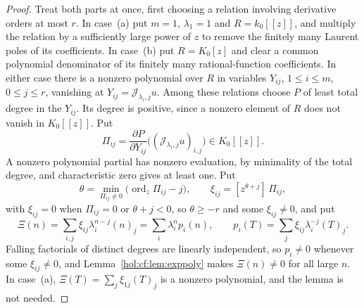 \documentclass[11pt]{article}
\numberwithin{equation}{section}
\theoremstyle{definition}
\theoremstyle{remark}
\newcommand{\fall}[2]{(#1)_{\underline{#2}}}
\newcommand{\ordz}{\operatorname{ord}_z}
\newcommand{\coeffz}[2]{[z^{#1}]\,#2}
\newcommand{\jet}[2]{\mathcal J_{#1,#2}}
\begin{document}
\begin{proof}
Treat both parts at once, first choosing a relation involving derivative
orders at most $r$. In case~(a) put $m=1$, $\lambda_1=1$ and
$R=k_0[[z]]$, and multiply the relation by a sufficiently large power of $z$
to remove the finitely many Laurent poles of its coefficients. In case~(b)
put $R=K_0[z]$ and clear a common polynomial denominator of its finitely many
rational-function coefficients. In either case there is a nonzero
polynomial over $R$ in variables $Y_{ij}$, $1\le i\le m$, $0\le j\le r$,
vanishing at $Y_{ij}=\jet{\lambda_i}ju$. Among these relations choose $P$ of
least total degree in the $Y_{ij}$. Its degree is positive, since a nonzero
element of $R$ does not vanish in $K_0[[z]]$. Put
\[
 \Pi_{ij}=\frac{\partial P}{\partial Y_{ij}}
 \bigl((\jet{\lambda_i}ju)_{i,j}\bigr)\in K_0[[z]].
\]
A nonzero polynomial partial has nonzero evaluation, by minimality of the
total degree, and characteristic zero gives at least one. Put
\begin{equation}\label{hol:cf:eq:theta}
 \theta=\min_{\Pi_{ij}\ne0}\bigl(\ordz\Pi_{ij}-j\bigr),\qquad
 \xi_{ij}=\coeffz{\theta+j}{\Pi_{ij}},
\end{equation}
with $\xi_{ij}=0$ when $\Pi_{ij}=0$ or $\theta+j<0$, so $\theta\ge-r$ and some
$\xi_{ij}\ne0$, and put
\begin{equation}\label{hol:cf:eq:multiplier}
 \Xi(n)=\sum_{i,j}\xi_{ij}\lambda_i^{n-j}\fall nj
 =\sum_i\lambda_i^np_i(n),\qquad
 p_i(T)=\sum_j\xi_{ij}\lambda_i^{-j}\fall Tj.
\end{equation}
Falling factorials of distinct degrees are linearly independent, so
$p_i\ne0$ whenever some $\xi_{ij}\ne0$, and
Lemma~\ref{hol:cf:lem:exppoly} makes $\Xi(n)\ne0$ for all large $n$. In
case~(a), $\Xi(T)=\sum_j\xi_{1j}\fall Tj$ is a nonzero polynomial, and the
lemma is not needed.


\end{proof}
\end{document}
